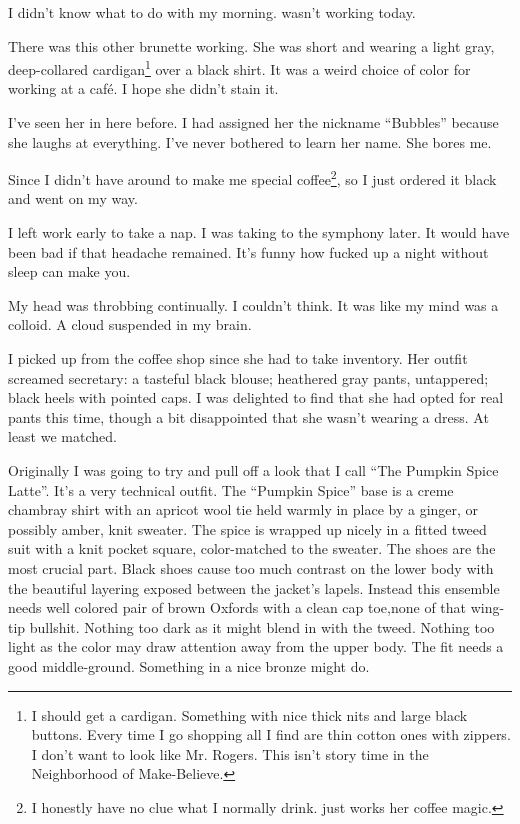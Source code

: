 \noindent
I didn't know what to do with my morning.  \april{} wasn't working today.


There was this other brunette working.
She was short and wearing a light gray, deep-collared cardigan\footnote{
  I should get a cardigan.
  Something with nice thick nits and large black buttons.
  Every time I go shopping all I find are thin cotton ones with zippers.
  I don't want to look like Mr. Rogers.
  This isn't story time in the Neighborhood of Make-Believe.
} over a black shirt.
It was a weird choice of color for working at a caf\'e.
I hope she didn't stain it.


I've seen her in here before.
I had assigned her the nickname ``Bubbles'' because she laughs at everything.
I've never bothered to learn her name.  She bores me.


Since I didn't have \april{} around to make me special coffee\footnote{
I honestly have no clue what I normally drink.
\april{} just works her coffee magic.
}, so I just ordered it black and went on my way.
\VV


\noindent
I left work early to take a nap.
I was taking \april{} to the symphony later.
It would have been bad if that headache remained.
It's funny how fucked up a night without sleep can make you.


My head was throbbing continually.
I couldn't think.
It was like my mind was a colloid.
A cloud suspended in my brain.

\lhoarnob
\noindent
I picked up \april{} from the coffee shop since she had to take inventory.
Her outfit screamed secretary:  a tasteful black blouse;
heathered gray pants, untappered; black heels with pointed caps.
I was delighted to find that she had opted for real pants this time,
though a bit disappointed that she wasn't wearing a dress.
At least we matched.


Originally I was going to try and pull off a look that I call
``The Pumpkin Spice Latte''.
It's a very technical outfit.
The ``Pumpkin Spice'' base is a creme chambray shirt with an apricot wool tie
held warmly in place by a ginger, or possibly amber, knit sweater.
The spice is wrapped up nicely in a fitted tweed suit with a knit pocket
square, color-matched to the sweater.
The shoes are the most crucial part.
Black shoes cause too much contrast on the lower body with the beautiful
layering exposed between the jacket's lapels.
Instead this ensemble needs well colored pair of brown Oxfords with
a clean cap toe,none of that wing-tip bullshit.
Nothing too dark as it might blend in with the tweed.
Nothing too light as the color may draw attention away from
the upper body.
The fit needs a good middle-ground.
Something in a nice bronze might do.


